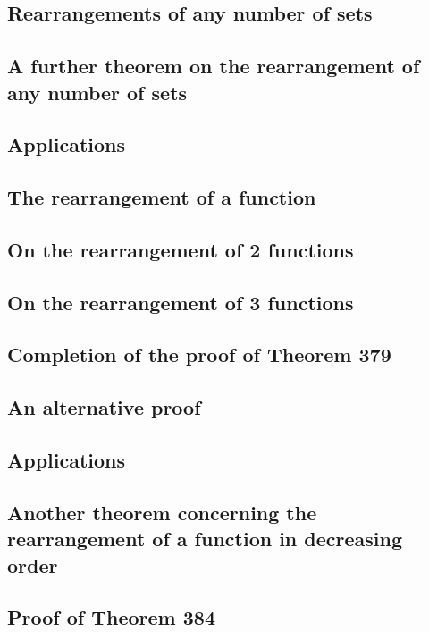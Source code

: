 \documentclass[oneside]{book}
\numberwithin{equation}{section}
\begin{document}
\subsection{Rearrangements of any number of sets}

\subsection{A further theorem on the rearrangement of any number of sets}

\subsection{Applications}

\subsection{The rearrangement of a function}

\subsection{On the rearrangement of 2 functions}

\subsection{On the rearrangement of 3 functions}

\subsection{Completion of the proof of Theorem 379}

\subsection{An alternative proof}

\subsection{Applications}

\subsection{Another theorem concerning the rearrangement of a function in decreasing order}

\subsection{Proof of Theorem 384}
\end{document}
